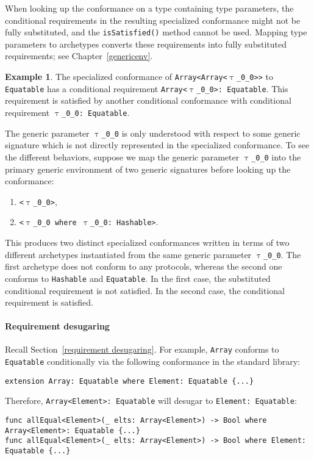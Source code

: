 \documentclass[a4paper,headsepline,bibliography=totoc,toc=flat,fleqn,twoside=semi]{scrbook}
\theoremstyle{definition}
\theoremstyle{definition}
\newtheorem{example}{Example}[chapter]
\theoremstyle{definition}
\newcommand{\ttgp}[2]{\texttt{$\uptau$\_#1\_#2}}
\begin{document}
When looking up the conformance on a type containing type parameters, the conditional requirements in the resulting specialized conformance might not be fully substituted, and the \texttt{isSatisfied()} method cannot be used. Mapping type parameters to archetypes converts these requirements into fully substituted requirements; see Chapter~\ref{genericenv}.

\begin{example}
The specialized conformance of \texttt{Array<Array<\ttgp{0}{0}>>} to \texttt{Equatable} has a conditional requirement \texttt{Array<\ttgp{0}{0}>:\ Equatable}. This requirement is satisfied by another conditional conformance with conditional requirement \texttt{\ttgp{0}{0}:\ Equatable}.

The generic parameter \texttt{\ttgp{0}{0}} is only understood with respect to some generic signature which is not directly represented in the specialized conformance. To see the different behaviors, suppose we map the generic parameter \texttt{\ttgp{0}{0}} into the primary generic environment of two generic signatures before looking up the conformance:
\begin{enumerate}
\item \texttt{<\ttgp{0}{0}>},
\item \texttt{<\ttgp{0}{0} where \ttgp{0}{0}:\ Hashable>}.
\end{enumerate}
This produces two distinct specialized conformances written in terms of two different archetypes instantiated from the same generic parameter \ttgp{0}{0}. The first archetype does not conform to any protocols, whereas the second one conforms to \texttt{Hashable} and \texttt{Equatable}. In the first case, the substituted conditional requirement is not satisfied. In the second case, the conditional requirement is satisfied.
\end{example}

\paragraph{Requirement desugaring} Recall Section~\ref{requirement desugaring}. For example, \texttt{Array} conforms to \texttt{Equatable} conditionally via the following conformance in the standard library:
\begin{Verbatim}
extension Array: Equatable where Element: Equatable {...}
\end{Verbatim}
Therefore, \texttt{Array<Element>:\ Equatable} will desugar to \texttt{Element:\ Equatable}:
\begin{Verbatim}
func allEqual<Element>(_ elts: Array<Element>) -> Bool where Array<Element>: Equatable {...}
func allEqual<Element>(_ elts: Array<Element>) -> Bool where Element: Equatable {...}
\end{Verbatim}
\end{document}
